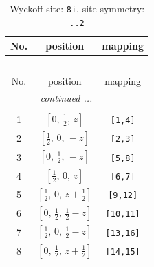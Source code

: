 \documentclass[fleqn,8pt]{jsarticle}
\begin{document}
\begin{longtable}{ccc}
\caption{Wyckoff site: {\tt 8i}, site symmetry: {\tt ..2}}
 \\
 \hline \hline
No. & position & mapping \\ \hline \endfirsthead

\multicolumn{2}{l}{\tablename\ \thetable{}} \\
 \hline \hline
No. & position & mapping \\ \hline \endhead

 \hline \hline
\multicolumn{2}{r}{\footnotesize\it continued ...} \\ \endfoot

 \hline \hline
\multicolumn{2}{r}{} \\ \endlastfoot

1 & $\left[ 0,\, \frac{1}{2},\, z \right]$ & {\tt [1,4]} \\ \hline
2 & $\left[ \frac{1}{2},\, 0,\, - z \right]$ & {\tt [2,3]} \\ \hline
3 & $\left[ 0,\, \frac{1}{2},\, - z \right]$ & {\tt [5,8]} \\ \hline
4 & $\left[ \frac{1}{2},\, 0,\, z \right]$ & {\tt [6,7]} \\ \hline
5 & $\left[ \frac{1}{2},\, 0,\, z + \frac{1}{2} \right]$ & {\tt [9,12]} \\ \hline
6 & $\left[ 0,\, \frac{1}{2},\, \frac{1}{2} - z \right]$ & {\tt [10,11]} \\ \hline
7 & $\left[ \frac{1}{2},\, 0,\, \frac{1}{2} - z \right]$ & {\tt [13,16]} \\ \hline
8 & $\left[ 0,\, \frac{1}{2},\, z + \frac{1}{2} \right]$ & {\tt [14,15]} \\
\end{longtable}
\renewcommand{\arraystretch}{1.2}
\end{document}
